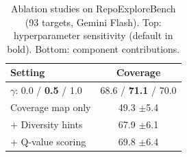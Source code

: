 \begin{table}[t]
\centering
\caption{Ablation studies on RepoExploreBench (93 targets, Gemini Flash). Top: hyperparameter sensitivity (default in bold). Bottom: component contributions.}
\label{tab:ablations}
\small
\begin{tabular}{lc}
\toprule
\textbf{Setting} & \textbf{Coverage} \\
\midrule
$\gamma$: 0.0 / \textbf{0.5} / 1.0 & 68.6 / \textbf{71.1} / 70.0 \\
\midrule
Coverage map only & 49.3 {\tiny$\pm$5.4} \\
\quad + Diversity hints & 67.9 {\tiny$\pm$6.1} \\
\quad + Q-value scoring & 69.8 {\tiny$\pm$6.4} \\
\bottomrule
\end{tabular}
\end{table}